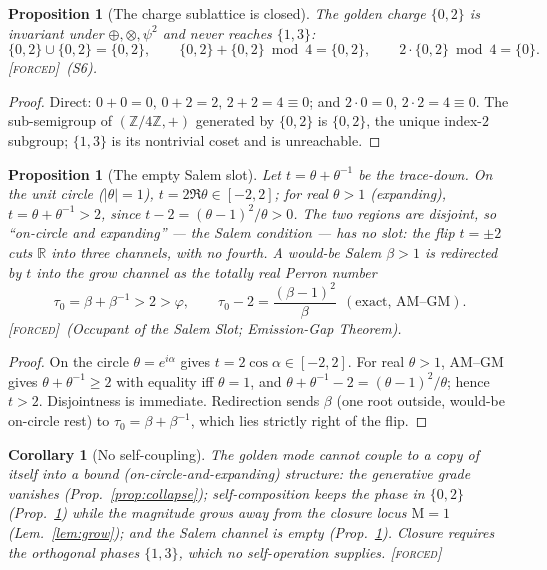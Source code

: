 \documentclass[11pt]{article}
\theoremstyle{plain}
\newtheorem{proposition}[theorem]{Proposition}
\newtheorem{corollary}[theorem]{Corollary}
\theoremstyle{definition}
\theoremstyle{remark}
\newcommand{\forced}{\textup{\textcolor{forcedc}{\textsc{[forced]}}}}
\newcommand{\R}{\mathbb{R}}
\newcommand{\Z}{\mathbb{Z}}
\newcommand{\Mah}{\mathrm{M}}
\newcommand{\abs}[1]{\left\lvert #1 \right\rvert}
\begin{document}
\begin{proposition}[The charge sublattice is closed]\label{prop:sublattice}
The golden charge $\{0,2\}$ is invariant under $\oplus,\otimes,\psi^2$ and never reaches $\{1,3\}$:
\[
\{0,2\}\cup\{0,2\}=\{0,2\},\qquad \{0,2\}+\{0,2\}\bmod4=\{0,2\},\qquad 2\cdot\{0,2\}\bmod4=\{0\}.
\]
\forced\ (S6).
\end{proposition}
\begin{proof}
Direct: $0+0=0,\,0+2=2,\,2+2=4\equiv0$; and $2\cdot0=0,\,2\cdot2=4\equiv0$. The sub-semigroup of
$(\Z/4\Z,+)$ generated by $\{0,2\}$ is $\{0,2\}$, the unique index-$2$ subgroup; $\{1,3\}$ is its
nontrivial coset and is unreachable.
\end{proof}

\begin{proposition}[The empty Salem slot]\label{prop:salem}
Let $t=\theta+\theta^{-1}$ be the trace-down. On the unit circle ($\abs\theta=1$), $t=2\Re\theta\in[-2,2]$;
for real $\theta>1$ (expanding), $t=\theta+\theta^{-1}>2$, since $t-2=(\theta-1)^2/\theta>0$. The two
regions are disjoint, so ``on-circle \emph{and} expanding'' --- the Salem condition --- has no slot: the flip
$t=\pm2$ cuts $\R$ into three channels, with no fourth. A would-be Salem $\beta>1$ is redirected by $t$ into
the grow channel as the totally real Perron number
\begin{equation}\label{eq:occupant}
\tau_0=\beta+\beta^{-1}>2>\varphi,\qquad \tau_0-2=\frac{(\beta-1)^2}{\beta}\ \ (\text{exact, AM--GM}).
\end{equation}
\forced\ (\emph{Occupant of the Salem Slot}; \emph{Emission-Gap Theorem}).
\end{proposition}
\begin{proof}
On the circle $\theta=e^{i\alpha}$ gives $t=2\cos\alpha\in[-2,2]$. For real $\theta>1$, AM--GM gives
$\theta+\theta^{-1}\ge2$ with equality iff $\theta=1$, and $\theta+\theta^{-1}-2=(\theta-1)^2/\theta$; hence
$t>2$. Disjointness is immediate. Redirection sends $\beta$ (one root outside, would-be on-circle rest) to
$\tau_0=\beta+\beta^{-1}$, which lies strictly right of the flip.
\end{proof}

\begin{corollary}[No self-coupling]\label{cor:noselfcouple}
The golden mode cannot couple to a copy of itself into a bound (on-circle-and-expanding) structure:
the generative grade vanishes (Prop.~\ref{prop:collapse}); self-composition keeps the phase in
$\{0,2\}$ (Prop.~\ref{prop:sublattice}) while the magnitude grows away from the closure locus
$\Mah=1$ (Lem.~\ref{lem:grow}); and the Salem channel is empty (Prop.~\ref{prop:salem}). Closure requires
the orthogonal phases $\{1,3\}$, which no self-operation supplies. \forced
\end{corollary}
\end{document}

